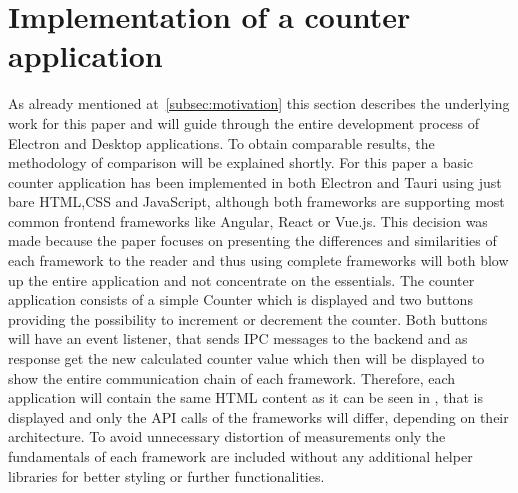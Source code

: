 \section{Implementation of a counter \\ application}
\label{sec:implementation}
As already mentioned at~\ref{subsec:motivation} this section describes the underlying work for this paper and will guide through the entire development process of Electron and Desktop applications.
To obtain comparable results, the methodology of comparison will be explained shortly.
For this paper a basic counter application has been implemented in both Electron and Tauri using just bare \ac{HTML},\ac{CSS} and JavaScript, although both frameworks are supporting most common frontend frameworks like Angular, React or Vue.js.
This decision was made because the paper focuses on presenting the differences and similarities of each framework to the reader and thus using complete frameworks will both blow up the entire application and not concentrate on the essentials.
The counter application consists of a simple Counter which is displayed and two buttons providing the possibility to increment or decrement the counter.
Both buttons will have an event listener, that sends \ac{IPC} messages to the backend and as response get the new calculated counter value which then will be displayed to show the entire communication chain of each framework.
Therefore, each application will contain the same \ac{HTML} content as it can be seen in \figref, that is displayed and only the API calls of the frameworks will differ, depending on their architecture.
To avoid unnecessary distortion of measurements only the fundamentals of each framework are included without any additional helper libraries for better styling or further functionalities.


